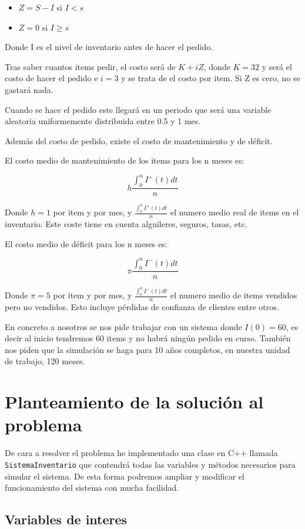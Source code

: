 \documentclass[12pt, spanish]{article}
\begin{document}
\begin{itemize}
	\item $Z = S - I$ si $I < s$
	\item $Z = 0$ si $I \geq s$
\end{itemize}

Donde I es el nivel de inventario antes de hacer el pedido.

Tras saber cuantos items pedir, el costo será de $K + iZ$, donde $K = 32$ y será el costo de hacer el pedido e $i = 3$ y se trata de el costo por item. Si Z es cero, no se gastará nada.

Cuando se hace el pedido este llegará en un periodo que será una variable aleatoria uniformemente distribuida entre 0.5 y 1 mes.

Además del costo de pedido, existe el costo de mantenimiento y de déficit.

El costo medio de mantenimiento de los items para los n meses es:

\[ h \frac{\int_0^n I^+ (t) dt}{n} \]

Donde $h = 1$ por item y por mes, y $\frac{\int_0^n I^+ (t) dt}{n}$ el numero medio real de items en el inventario. Este coste tiene en cuenta alguileres, seguros, tasas, etc.

El costo medio de déficit para los n meses es:

\[ \pi \frac{\int_0^n I^- (t) dt}{n} \]

Donde $\pi = 5$ por item y por mes, y $\frac{\int_0^n I^- (t) dt}{n}$ el numero medio de items vendidos pero no vendidos. Esto incluye pérdidas de confianza de clientes entre otros.

En concreto a nosotros se nos pide trabajar con un sistema donde $I(0) = 60$, es decir al inicio tendremos 60 items y no habrá ningún pedido en curso. También nos piden que la simulación se haga para 10 años completos, en nuestra unidad de trabajo, 120 meses.


\section{Planteamiento de la solución al problema}

De cara a resolver el problema he implementado una clase en C++ llamada \texttt{SistemaInventario} que contendrá todas las variables y métodos necesarios para simular el sistema. De esta forma podremos ampliar y modificar el funcionamiento del sistema con mucha facilidad.

\subsection{Variables de interes}
\end{document}
